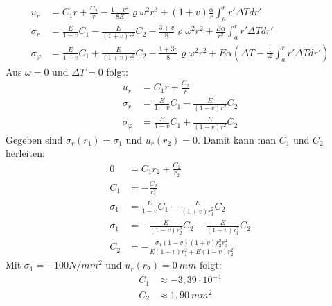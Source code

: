 \documentclass[]{article}
\begin{document}
\begin{center}
\end{center}
\begin{align*}
u_r&=C_1r+\frac{C_2}{r}-\frac{1-v^2}{8E}\varrho\omega^2r^3+(1+v)\frac{\alpha}{r}\int_{a}^{r}r'\Delta Tdr'\\
\sigma_r&=\frac{E}{1-v}C_1-\frac{E}{(1+v)r^2}C_2-\frac{3+v}{8}\varrho\omega^2r^2+\frac{E\alpha}{r^2}\int_{a}^{r}r'\Delta Tdr'\\
\sigma_\varphi&=\frac{E}{1-v}C_1+\frac{E}{(1+v)r^2}C_2-\frac{1+3v}{8}\varrho\omega^2r^2+E\alpha(\Delta T-\frac{1}{r^2}\int_{a}^{r}r'\Delta Tdr')
\end{align*}
Aus $\omega=0$ und $\Delta T=0$ folgt:
\begin{align*}
u_r&=C_1r+\frac{C_2}{r}\\
\sigma_r&=\frac{E}{1-v}C_1-\frac{E}{(1+v)r^2}C_2\\
\sigma_\varphi&=\frac{E}{1-v}C_1+\frac{E}{(1+v)r^2}C_2
\end{align*}
Gegeben sind $\sigma_r(r_1)=\sigma_1$ und $u_r(r_2)=0$. Damit kann man $C_1$ und $C_2$  herleiten:
\begin{align*}
0&=C_1r_2+\frac{C_2}{r_2}\\
C_1&=-\frac{C_2}{r^2_2}\tag{1}\\
\sigma_1&=\frac{E}{1-v}C_1-\frac{E}{(1+v)r^2_1}C_2\\
\sigma_1&=-\frac{E}{(1-v)r^2_2}C_2-\frac{E}{(1+v)r^2_1}C_2\\
C_2&=-\frac{\sigma_1(1-v)(1+v)r^2_2r^2_1}{E(1+v)r^2_1+E(1-v)r^2_2}\tag{2}
\end{align*}
Mit $\sigma_1=-100N/mm^2$ und $u_r(r_2)=0\ mm$ folgt:
\begin{align*}
C_1&\approx -3,39\cdot 10^{-4}\\
C_2&\approx 1,90\ mm^2
\end{align*}
\def\CA{-0.000339} %
\def\CB{1.90} %
\def\E{200000}
\def\sigR{\E*(\CA/0.7-\CB/(1.3*x*x))}
\def\sigP{\E*(\CA/0.7+\CB/(1.3*x*x))}
\end{document}
